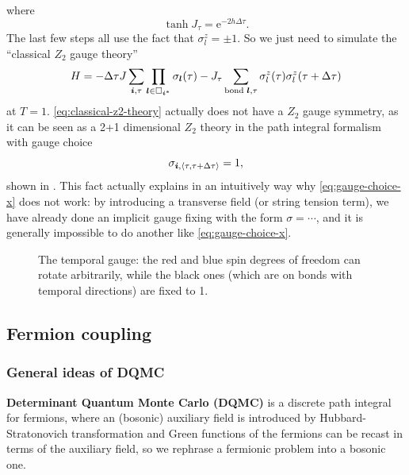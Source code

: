 \documentclass[hyperref, a4paper]{article}
\newcommand*{\ee}{\mathrm{e}}
\newcommand*{\pair}[1]{\langle #1 \rangle}
\newcommand*{\concept}[1]{{\textbf{#1}}}
\newcommand*{\Ztwo}{$\mathbb{Z}_2$ }
\def\mathbb#1{#1}%
\begin{document}
where 
\begin{equation}
    \tanh J_\tau = \ee^{-2 h \Delta \tau}.
\end{equation}
The last few steps all use the fact that $\sigma^z_l = \pm 1$.
So we just need to simulate the ``classical \Ztwo gauge theory''
\begin{equation}
    H = - \Delta \tau J \sum_{\vb*{i}, \tau} \prod_{\vb*{l} \in \Box_{\vb*{i}^*}} \sigma_{\vb*{l}}(\tau) 
    - J_\tau \sum_{\text{bond $\vb*{l}$}, \tau} \sigma_l^z(\tau) \sigma_l^z(\tau + \Delta \tau)
    \label{eq:classical-z2-theory}
\end{equation}
at $T = 1$. \eqref{eq:classical-z2-theory} actually does not have a \Ztwo gauge symmetry, as it can be seen as a 2+1 dimensional \Ztwo theory in the path integral formalism with gauge choice
\begin{equation}
    \sigma_{\vb*{i}, \pair{\tau, \tau + \Delta \tau}} = 1,
\end{equation}
shown in .
This fact actually explains in an intuitively way why \eqref{eq:gauge-choice-x} does not work:
by introducing a transverse field (or string tension term), we have already done an implicit gauge fixing with the form $\sigma=\cdots$, and it is generally impossible to do another like \eqref{eq:gauge-choice-x}.

\begin{figure}
    \centering
    
    \caption{The temporal gauge: the red and blue spin degrees of freedom can rotate arbitrarily, while the black ones (which are on bonds with temporal directions) are fixed to 1. }
    \label{fig:temporal-gauge}
\end{figure}

\subsection{Fermion coupling}

\subsubsection{General ideas of DQMC}

\concept{Determinant Quantum Monte Carlo (DQMC)} is a discrete path integral for fermions, 
where an (bosonic) auxiliary field is introduced by Hubbard-Stratonovich transformation and Green functions of the fermions can be recast in terms of the auxiliary field, so we rephrase a fermionic problem into a bosonic one.
\end{document}
